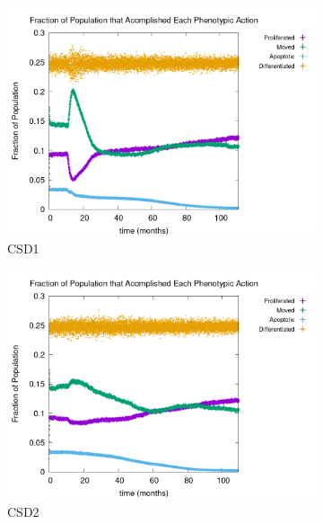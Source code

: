 \documentclass[\main/thesis.tex]{subfiles}
\begin{document}
\begin{figure}[H]
    \centering
    \begin{subfigure}[t]{.6\textwidth}
      \centering
      \includegraphics[width=\textwidth]{images/4_CarcinFunc/Fig4/numPheno_all_Func1.png}
      \caption{CSD1}
      \label{fig:CarcinFunc_numPheno_Func1}
    \end{subfigure}
    \begin{subfigure}[t]{.6\textwidth}
      \centering
      \includegraphics[width=\textwidth]{images/4_CarcinFunc/Fig4/numPheno_all_Func2.png}
      \caption{CSD2}
      \label{fig:CarcinFunc_numPheno_Func2}
    \end{subfigure}
    \begin{subfigure}[t]{.6\textwidth}

\end{subfigure}
\end{figure}
\end{document}
